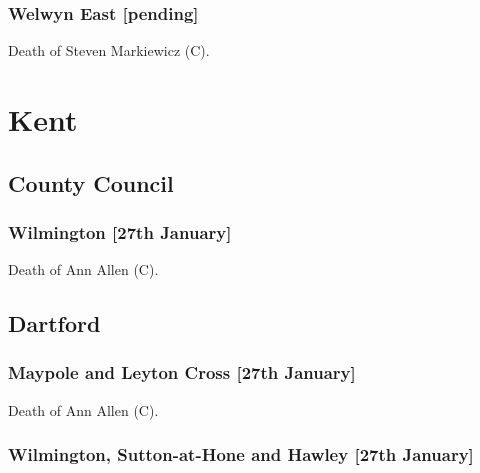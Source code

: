 \documentclass[a4paper,openany]{book}
\begin{document}
\begin{resultsiii}
\subsubsection*{Welwyn East \hspace*{\fill}\nolinebreak[1]%
	\enspace\hspace*{\fill}
	[pending]}


Death of Steven Markiewicz (C).

\section{Kent}

\subsection*{County Council}

\subsubsection*{Wilmington \hspace*{\fill}\nolinebreak[1]%
	\enspace\hspace*{\fill}
	[27th January]}


Death of Ann Allen (C).

\subsection*{Dartford}

\subsubsection*{Maypole and Leyton Cross \hspace*{\fill}\nolinebreak[1]%
	\enspace\hspace*{\fill}
	[27th January]}


Death of Ann Allen (C).

\subsubsection*{Wilmington, Sutton-at-Hone and Hawley \hspace*{\fill}\nolinebreak[1]%
	\enspace\hspace*{\fill}
	[27th January]}


\end{resultsiii}
\end{document}
